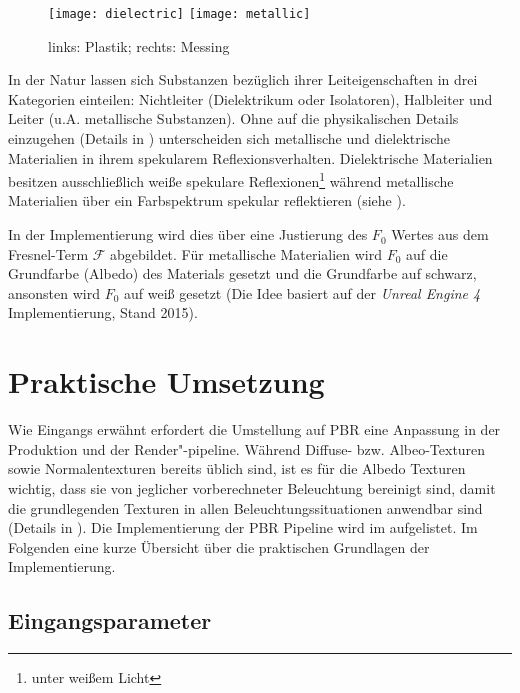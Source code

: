 \begin{figure}
	\texttt{[image: dielectric]}
	\texttt{[image: metallic]}
	\caption[Dielektische und metallische Materialien]{links: Plastik; rechts: Messing}
	\label{fig:dielectric-metallic}
\end{figure}

In der Natur lassen sich Substanzen bezüglich ihrer Leiteigenschaften in drei Kategorien einteilen: Nichtleiter (Dielektrikum oder Isolatoren), Halbleiter und Leiter (u.A. metallische Substanzen). Ohne auf die physikalischen Details einzugehen (Details in \cite[Abschnitt: Glanz und Farbe der Metalle]{Zawischa2011}) unterscheiden sich metallische und dielektrische Materialien in ihrem spekularem Reflexionsverhalten. Dielektrische Materialien besitzen ausschließlich weiße spekulare Reflexionen\footnote{unter weißem Licht} während metallische Materialien über ein Farbspektrum spekular reflektieren \parencite[Abschnitt: Specular]{Lagarde2011a}(siehe ).

In der Implementierung wird dies über eine Justierung des $F_0$ Wertes aus dem Fresnel-Term $\mathcal{F}$ abgebildet. Für metallische Materialien wird $F_0$ auf die Grundfarbe (Albedo) des Materials gesetzt und die Grundfarbe auf schwarz, ansonsten wird $F_0$ auf weiß gesetzt (Die Idee basiert auf der \textit{Unreal Engine 4} Implementierung, Stand 2015).

\section{Praktische Umsetzung}
\label{sec:pbr-umsetzung}

Wie Eingangs erwähnt erfordert die Umstellung auf \ac{PBR} eine Anpassung in der Produktion und der Render"-pipeline. Während Diffuse- bzw. Albeo-Texturen sowie Normalentexturen bereits üblich sind, ist es für die Albedo Texturen wichtig, dass sie von jeglicher vorberechneter Beleuchtung bereinigt sind, damit die grundlegenden Texturen in allen Beleuchtungssituationen anwendbar sind (Details in \cite{Lagarde2011}). Die Implementierung der \ac{PBR} Pipeline wird im  aufgelistet. Im Folgenden eine kurze Übersicht über die praktischen Grundlagen der Implementierung.

\subsection{Eingangsparameter}

